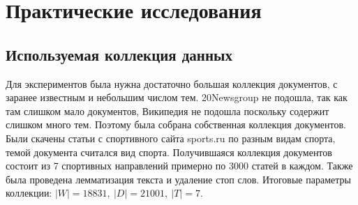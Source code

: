 \documentclass[12pt]{article}
\begin{document}
	\section{Практические исследования}
\subsection{Используемая коллекция данных}
Для экспериментов была нужна достаточно большая коллекция документов, с заранее известным  и небольшим числом тем. 20Newsgroup не подошла, так как там слишком мало документов, Википедия не подошла поскольку содержит слишком много тем. Поэтому была собрана собственная коллекция документов. Были скачены статьи с спортивного сайта sports.ru по разным видам спорта, темой документа считался вид спорта. Получившаяся коллекция документов состоит из 7 спортивных направлений примерно по 3000 статей в каждом. Также была проведена лемматизация текста и удаление стоп слов. Итоговые параметры коллекции: $|W| = 18831,~|D| = 21001,~|T| = 7$.
\end{document}
